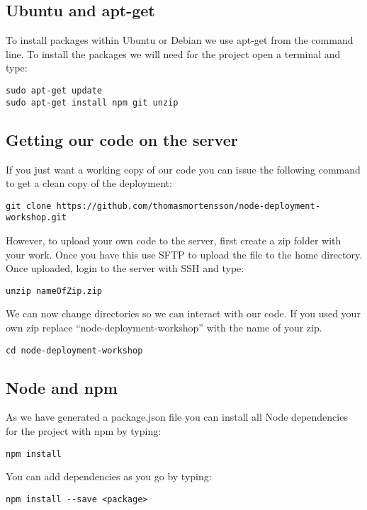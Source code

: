 \documentclass[twocolumn]{article}
\begin{document}
\subsection{Ubuntu and apt-get}

To install packages within Ubuntu or Debian we use apt-get from the command line. To install the packages we will need for the project open a terminal and type:
\begin{lstlisting}
sudo apt-get update
sudo apt-get install npm git unzip
\end{lstlisting}

\subsection{Getting our code on the server}

If you just want a working copy of our code you can issue the following command to get a clean copy of the deployment:
\begin{lstlisting}
git clone https://github.com/thomasmortensson/node-deployment-workshop.git
\end{lstlisting}

However, to upload your own code to the server, first create a zip folder with your work. Once you have this use SFTP to upload the file to the home directory. Once uploaded, login to the server with SSH and type:
\begin{lstlisting}
unzip nameOfZip.zip
\end{lstlisting}
We can now change directories so we can interact with our code. If you used your own zip replace ``node-deployment-workshop'' with the name of your zip.
\begin{lstlisting}
cd node-deployment-workshop
\end{lstlisting}

\subsection{Node and npm}

As we have generated a package.json file you can install all Node dependencies for the project with npm by typing:
\begin{lstlisting}
npm install
\end{lstlisting}

You can add dependencies as you go by typing:
\begin{lstlisting}
npm install --save <package>
\end{lstlisting}
\end{document}
